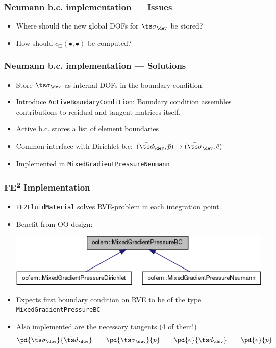 \documentclass[11pt]{beamer} %
\begin{document}
\begin{frame}
\frametitle{Neumann b.c. implementation --- Issues}
 \begin{itemize}
  \item Where should the new global DOFs for $\bar{\ts\sigma}_\dev$ be stored?
  \item How should $c_\Box(\bullet,\bullet)$ be computed?
 \end{itemize}
\end{frame}
\begin{frame}
\frametitle{Neumann b.c. implementation --- Solutions}
 \begin{itemize}
  \item Store $\bar{\ts\sigma}_{\dev}$ as internal DOFs in the boundary condition.
  \item Introduce \texttt{ActiveBoundaryCondition}: Boundary condition assembles contributions to residual and tangent matrices itself.
  \item Active b.c. stores a list of element boundaries
  \item Common interface with Dirichlet b.c; $(\bar{\ts d}_\dev, \bar{p}) \to (\bar{\ts\sigma}_\dev,\bar{e})$
  \item Implemented in \texttt{MixedGradientPressureNeumann}
 \end{itemize}
\end{frame}

\begin{frame}
 \frametitle{FE\textsuperscript{2} Implementation}
 \begin{itemize}
  \item \texttt{FE2FluidMaterial} solves RVE-problem in each integration point.
  \item Benefit from OO-design:\\
 \begin{center}
 \includegraphics[width=0.7\linewidth]{figures/mixedgradientpressurebc.png}
  \end{center}
  \item Expects first boundary condition on RVE to be of the type \texttt{MixedGradientPressureBC}
  \item Also implemented are the necessary tangents (4 of them!)
  \begin{align*}
   \pd{\bar{\ts\sigma}_\dev}{\bar{\ts d}_\dev} \qquad
   \pd{\bar{\ts\sigma}_\dev}{\bar{p}} \qquad
   \pd{\bar{e}}{\bar{\ts d}_\dev} \qquad
   \pd{\bar{e}}{\bar{p}}
  \end{align*}
 \end{itemize}
\end{frame}
\end{document}
